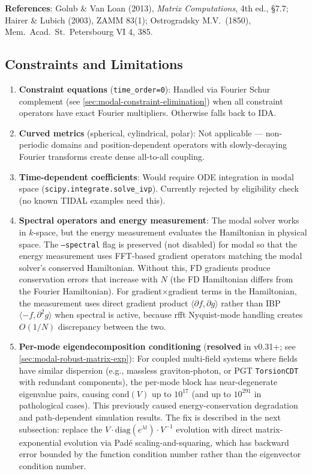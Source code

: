\textbf{References}: Golub \& Van Loan (2013), \emph{Matrix Computations}, 4th ed., \S7.7; Hairer \& Lubich (2003), ZAMM 83(1); Ostrogradsky M.V.\ (1850), Mem.\ Acad.\ St.\ Petersbourg VI 4, 385.

\subsection{Constraints and Limitations}
\label{sec:modal-constraints-limitations}

\begin{enumerate}
  \item \textbf{Constraint equations} (\texttt{time\_order=0}): Handled via Fourier Schur complement (see \cref{sec:modal-constraint-elimination}) when all constraint operators have exact Fourier multipliers. Otherwise falls back to IDA.

  \item \textbf{Curved metrics} (spherical, cylindrical, polar): Not applicable --- non-periodic domains and position-dependent operators with slowly-decaying Fourier transforms create dense all-to-all coupling.

  \item \textbf{Time-dependent coefficients}: Would require ODE integration in modal space (\texttt{scipy.integrate.solve\_ivp}). Currently rejected by eligibility check (no known TIDAL examples need this).

  \item \textbf{Spectral operators and energy measurement}: The modal solver works in $k$-space, but the energy measurement evaluates the Hamiltonian in physical space. The \texttt{--spectral} flag is preserved (not disabled) for modal so that the energy measurement uses FFT-based gradient operators matching the modal solver's conserved Hamiltonian. Without this, FD gradients produce conservation errors that increase with $N$ (the FD Hamiltonian differs from the Fourier Hamiltonian). For gradient$\times$gradient terms in the Hamiltonian, the measurement uses direct gradient product $\langle \partial f, \partial g \rangle$ rather than IBP $\langle -f, \partial^2 g \rangle$ when spectral is active, because rfft Nyquist-mode handling creates $O(1/N)$ discrepancy between the two.

  \item \textbf{Per-mode eigendecomposition conditioning} (\textbf{resolved} in v0.31+; see \cref{sec:modal-robust-matrix-exp}): For coupled multi-field systems where fields have similar dispersion (e.g., massless graviton-photon, or PGT \texttt{TorsionCDT} with redundant components), the per-mode block has near-degenerate eigenvalue pairs, causing $\mathrm{cond}(V)$ up to $10^{17}$ (and up to $10^{291}$ in pathological cases). This previously caused energy-conservation degradation and path-dependent simulation results. The fix is described in the next subsection: replace the $V \cdot \mathrm{diag}(e^{\lambda t}) \cdot V^{-1}$ evolution with direct matrix-exponential evolution via Pad\'{e} scaling-and-squaring, which has backward error bounded by the function condition number rather than the eigenvector condition number.
\end{enumerate}

